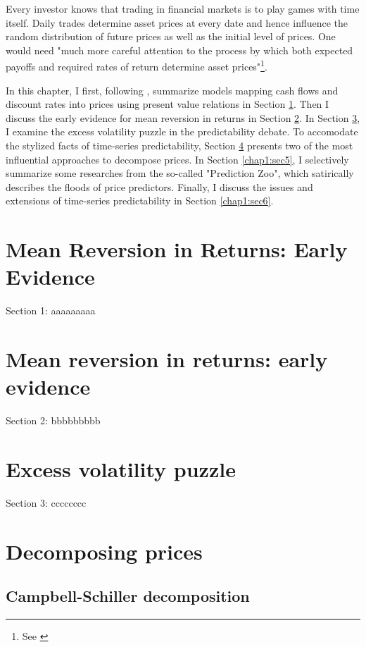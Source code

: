 \minitoc

\vspace{0.5cm}
Every investor knows that trading in financial markets is to play
games with time itself. Daily trades determine asset prices at every date and hence
influence the random distribution of future prices as well as the initial
level of prices. One would need "much more careful attention to the process
by which both expected payoffs and required rates of return determine
asset prices"\footnote{See \citet[p.~121]{campbell2017financial}}.

In this chapter, I first, following \citet[Chapter~5]{campbell2017financial}, summarize models 
mapping cash flows and discount rates into prices using present value relations in Section \ref{chap1:sec1}.
Then I discuss the early evidence for mean reversion in returns in Section \ref{chap1:sec2}.
In Section \ref{chap1:sec3}, I examine the excess volatility puzzle in the predictability debate.
To accomodate the stylized facts of time-series predictability, Section \ref{chap1:sec4}
presents two of the most influential approaches to decompose prices. In Section \ref{chap1:sec5},
I selectively summarize some researches from the so-called "Prediction Zoo", which satirically 
describes the floods of price predictors. Finally, I discuss the issues and extensions of time-series
predictability in Section \ref{chap1:sec6}.


\section{Mean Reversion in Returns: Early Evidence}\label{chap1:sec1}
Section 1: aaaaaaaaa

\section{Mean reversion in returns: early evidence}\label{chap1:sec2}
Section 2: bbbbbbbbb

\section{Excess volatility puzzle}\label{chap1:sec3}
Section 3: cccccccc

\section{Decomposing prices}\label{chap1:sec4}
\subsection{Campbell-Schiller decomposition}\label{chap1:sec4:ssec1}
